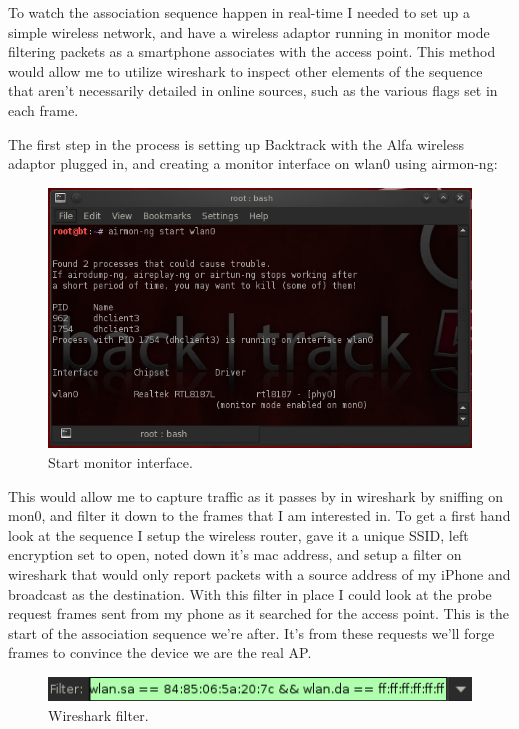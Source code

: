 To watch the association sequence happen in real-time I needed to set up a simple wireless network, and have a wireless adaptor running in monitor mode filtering packets as a smartphone associates with the access point. This method would allow me to utilize wireshark to inspect other elements of the sequence that aren’t necessarily detailed in online sources, such as the various flags set in each frame.

The first step in the process is setting up Backtrack with the Alfa wireless adaptor plugged in, and creating a monitor interface on wlan0 using airmon-ng:

\begin{figure}[h!]
\includegraphics[width=\linewidth]{research/80211/figures/bt1.png}
\caption{Start monitor interface.}
\label{research:80211:bt1}
\end{figure}

This would allow me to capture traffic as it passes by in wireshark by sniffing on mon0, and filter it down to the frames that I am interested in. To get a first hand look at the sequence I setup the wireless router, gave it a unique SSID, left encryption set to open, noted down it’s mac address, and setup a filter on wireshark that would only report packets with a source address of my iPhone and broadcast as the destination. With this filter in place I could look at the probe request frames sent from my phone as it searched for the access point. This is the start of the association sequence we’re after. It’s from these requests we’ll forge frames to convince the device we are the real AP.

\begin{figure}[h!]
\includegraphics[width=\linewidth]{research/80211/figures/bt2.png}
\caption{Wireshark filter.}
\label{research:80211:bt2}
\end{figure}

